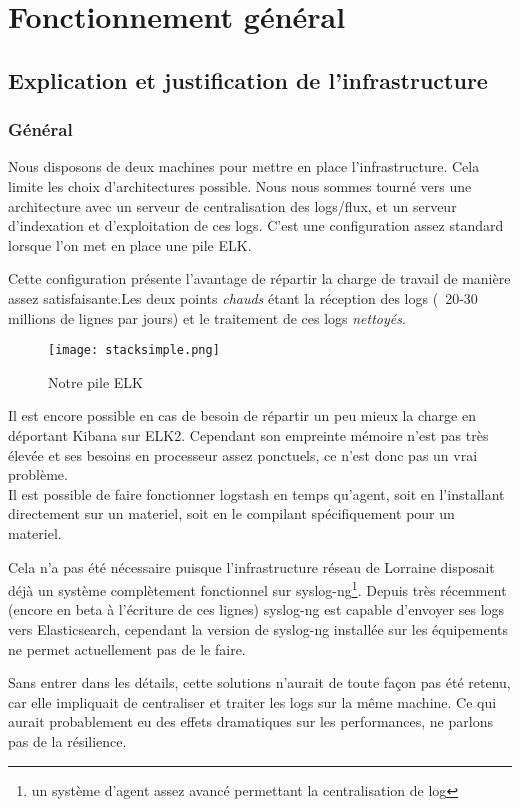 \chapter{Fonctionnement général}
\section{Explication et justification de l'infrastructure}
\subsection{Général}
Nous disposons de deux machines pour mettre en place l'infrastructure.
Cela limite les choix d'architectures possible. Nous nous sommes tourné vers une 
architecture avec un serveur de centralisation des logs/flux, et un serveur 
d'indexation et d'exploitation de ces \gls{logs}. C'est une configuration assez standard
lorsque l'on met en place une pile ELK.

Cette configuration présente l'avantage de répartir la charge de travail de manière 
assez satisfaisante.Les deux points \textit{chauds} étant la réception des logs 
(~20-30 millions de lignes par jours) et le traitement de ces logs \textit{nettoyés}.


\begin{figure}[H]
\center
\texttt{[image: stacksimple.png]}
\label{fig:elkstack1}
\caption{Notre pile ELK}
\end{figure}

Il est encore possible en cas de besoin de répartir un peu mieux la charge
en déportant Kibana sur ELK2. Cependant son empreinte mémoire n'est pas très élevée
et ses besoins en processeur assez ponctuels, ce n'est donc pas un vrai problème.\\[5mm]

Il est possible de faire fonctionner logstash en temps qu'agent, soit en l'installant
directement sur un materiel, soit en le compilant spécifiquement pour un materiel.

Cela n'a pas été nécessaire puisque l'infrastructure réseau de Lorraine disposait 
déjà un système complètement fonctionnel sur syslog-ng\footnote{un système d'agent 
assez avancé permettant la centralisation de log}. 
Depuis très récemment (encore en beta à l'écriture de ces lignes) syslog-ng est 
capable d'envoyer ses logs vers Elasticsearch, cependant la version de syslog-ng
installée sur les équipements ne permet actuellement pas de le faire.

Sans entrer dans les détails, cette solutions n'aurait de toute façon pas été retenu,
car elle impliquait de centraliser et traiter les logs sur la même machine. Ce qui
aurait probablement eu des effets dramatiques sur les performances, ne parlons pas 
de la résilience.


